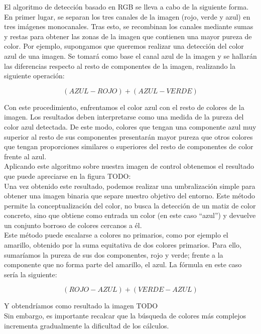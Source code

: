 El algoritmo de detección basado en RGB se lleva a cabo de la siguiente forma. En primer lugar, se separan los tres canales de la imagen (rojo, verde y azul) en tres imágenes monocanales. Tras esto, se recombinan los canales mediante sumas y restas para obtener las zonas de la imagen que contienen una mayor pureza de color. Por ejemplo, supongamos que queremos realizar una detección del color azul de una imagen. Se tomará como base el canal azul de la imagen y se hallarán las diferencias respecto al resto de componentes de la imagen, realizando la siguiente operación:

\[(AZUL - ROJO) + (AZUL - VERDE)\]

Con este procedimiento, enfrentamos el color azul con el resto de colores de la imagen. Los resultados deben interpretarse como una medida de la pureza del color azul detectada. De este modo, colores que tengan una componente azul muy superior al resto de sus componentes presentarán mayor pureza que otros colores que tengan proporciones similares o superiores del resto de componentes de color frente al azul.\\

Aplicando este algoritmo sobre nuestra imagen de control obtenemos el resultado que puede apreciarse en la figura TODO:\\

Una vez obtenido este resultado, podemos realizar una umbralización simple para obtener una imagen binaria que separe nuestro objetivo del entorno. Este método permite la conceptualización del color, no busca la detección de un matiz de color concreto, sino que obtiene como entrada un color (en este caso “azul”) y devuelve un conjunto borroso de colores cercanos a él.\\

Este método puede escalarse a colores no primarios, como por ejemplo el amarillo, obtenido por la suma equitativa de dos colores primarios. Para ello, sumaríamos la pureza de sus dos componentes, rojo y verde; frente a la componente que no forma parte del amarillo, el azul. La fórmula en este caso sería la siguiente:

\[(ROJO - AZUL) + (VERDE - AZUL) \]

Y obtendríamos como resultado la imagen TODO\\

Sin embargo, es importante recalcar que la búsqueda de colores más complejos incrementa gradualmente la dificultad de los cálculos.\\

